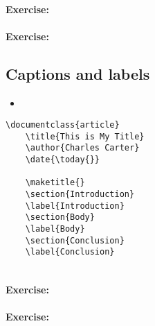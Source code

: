         \paragraph{Exercise:}

        \paragraph{Exercise:}

        \subsection{Captions and labels}
        \label{Captions and labels}
        
        \begin{framed}
            \begin{itemize}
                \item{}
            \end{itemize}
        \end{framed}


        \begin{verbatim}
\documentclass{article}
    \title{This is My Title}
    \author{Charles Carter}
    \date{\today{}}
 
    \maketitle{}
    \section{Introduction}
    \label{Introduction}
    \section{Body}
    \label{Body}
    \section{Conclusion}
    \label{Conclusion}
    
        \end{verbatim}

        \paragraph{Exercise:}

        \paragraph{Exercise:}

